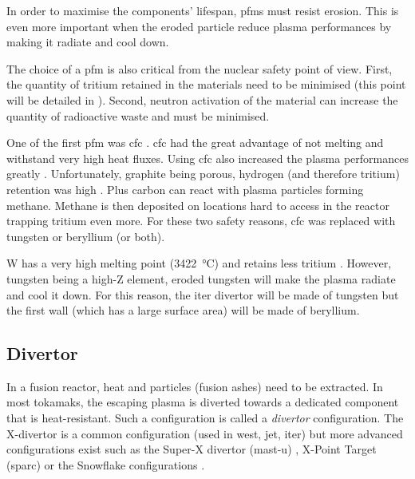 In order to maximise the components' lifespan, \glspl{pfm} must resist erosion.
This is even more important when the eroded particle reduce \gls{plasma} performances by making it radiate and cool down.

The choice of a \gls{pfm} is also critical from the nuclear safety point of view.
First, the quantity of tritium retained in the materials need to be minimised (this point will be detailed in ).
Second, neutron activation of the material can increase the quantity of radioactive waste and must be minimised.

One of the first \gls{pfm} was \gls{cfc} .
\gls{cfc} had the great advantage of not melting and withstand very high heat fluxes.
Using \gls{cfc} also increased the \gls{plasma} performances greatly .
Unfortunately, graphite being porous, hydrogen (and therefore tritium) retention was high .
Plus carbon can react with \gls{plasma} particles forming methane.
Methane is then deposited on locations hard to access in the reactor \gls{trapping} tritium even more.
For these two safety reasons, \gls{cfc} was replaced with tungsten or beryllium (or both).

\Gls{W} has a very high melting point (\SI{3422}{\celsius}) and retains less tritium .
However, tungsten being a high-Z element, eroded tungsten will make the \gls{plasma} radiate and cool it down.
For this reason, the \acrshort{iter} divertor will be made of tungsten but the first wall (which has a large surface area) will be made of beryllium.

\subsection{Divertor}

In a fusion reactor, heat and particles (fusion ashes) need to be extracted.
In most \glspl{tokamak}, the escaping \gls{plasma} is diverted towards a dedicated component that is heat-resistant.
Such a configuration is called a \emph{\gls{divertor}} configuration.
The X-divertor is a common configuration (used in \acrshort{west}, \acrshort{jet}, \acrshort{iter}) but more advanced configurations exist such as the Super-X \gls{divertor} (\acrshort{mast-u}) , X-Point Target (\acrshort{sparc})  or the Snowflake configurations .

